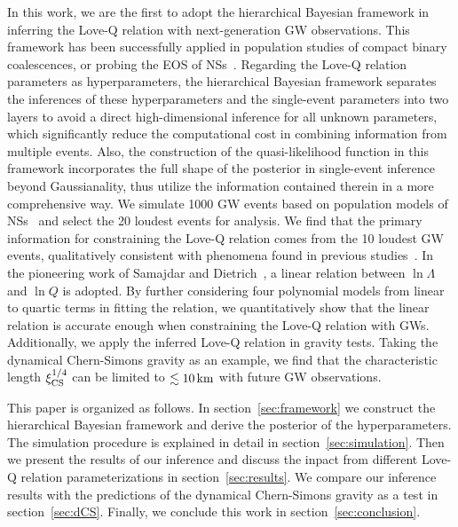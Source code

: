 \documentclass[a4paper,11pt]{article}
\begin{document}
In this work, we are the first to adopt the hierarchical Bayesian framework in inferring the Love-Q relation with next-generation GW observations.
This framework has been successfully applied in 
population studies of compact binary coalescences, or probing the EOS of NSs~\cite{Mandel:2009nx,Mandel:2009pc,Adams:2012qw,Lackey:2014fwa,Mandel:2018mve,Thrane_2019,KAGRA:2021duu,Wang:2024xon}. 
Regarding the Love-Q relation parameters as hyperparameters, the hierarchical 
Bayesian framework separates the inferences of these hyperparameters and the 
single-event parameters into two layers to avoid a direct high-dimensional inference
for all unknown parameters, which significantly reduce the computational cost
in combining information from multiple events.
 Also, the construction of the quasi-likelihood
function in this framework incorporates the full shape of the
posterior in single-event inference beyond Gaussianality, thus
utilize the information contained therein in a more comprehensive way.
We simulate 1000 GW events based on population models of
NSs~\cite{Fishbach:2018edt,Farrow:2019xnc,Samajdar:2020xrd} and select the 20
loudest events for analysis. We find that the primary information for
constraining the Love-Q relation comes from the 10 loudest GW events,
qualitatively consistent
with phenomena found in
previous studies~\cite{Lackey:2014fwa}. In the pioneering work of Samajdar and
Dietrich~\cite{Samajdar:2020xrd}, a linear relation between $\ln\Lambda$ and $\ln Q$
is adopted. By further considering four polynomial models
from linear to quartic terms in fitting the relation, we quantitatively show
 that
the linear relation is accurate enough when constraining the Love-Q relation
with GWs. Additionally, we apply the inferred Love-Q relation in gravity tests.
Taking the dynamical Chern-Simons gravity as an example, we find that the
characteristic length $\xi_{\rm CS}^{1/4}$ can be limited to $\lesssim 10\,{\rm km}$
with future GW observations. 

This paper is organized as follows. In section~\ref{sec:framework} we construct 
the hierarchical Bayesian framework and derive the posterior of the hyperparameters. 
The simulation procedure is explained in detail in section~\ref{sec:simulation}. 
Then we present the results of our inference and discuss the inpact from different 
Love-Q relation parameterizations in section~\ref{sec:results}. 
We compare our inference results with the predictions of the dynamical Chern-Simons 
gravity as a test in section~\ref{sec:dCS}. Finally, we conclude this work in section~\ref{sec:conclusion}.
\end{document}
